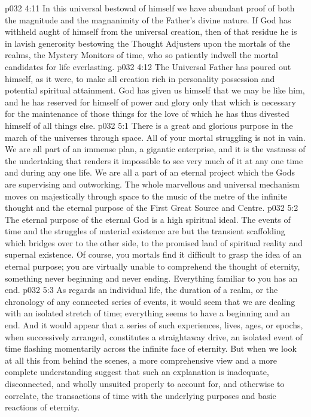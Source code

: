\vs p032 4:11 In this universal bestowal of himself we have abundant proof of both the magnitude and the magnanimity of the Father’s divine nature. If God has withheld aught of himself from the universal creation, then of that residue he is in lavish generosity bestowing the Thought Adjusters upon the mortals of the realms, the Mystery Monitors of time, who so patiently indwell the mortal candidates for life everlasting.
\vs p032 4:12 The Universal Father has poured out himself, as it were, to make all creation rich in personality possession and potential spiritual attainment. God has given us himself that we may be like him, and he has reserved for himself of power and glory only that which is necessary for the maintenance of those things for the love of which he has thus divested himself of all things else.
\vs p032 5:1 There is a great and glorious purpose in the march of the universes through space. All of your mortal struggling is not in vain. We are all part of an immense plan, a gigantic enterprise, and it is the vastness of the undertaking that renders it impossible to see very much of it at any one time and during any one life. We are all a part of an eternal project which the Gods are supervising and outworking. The whole marvellous and universal mechanism moves on majestically through space to the music of the metre of the infinite thought and the eternal purpose of the First Great Source and Centre.
\vs p032 5:2 The eternal purpose of the eternal God is a high spiritual ideal. The events of time and the struggles of material existence are but the transient scaffolding which bridges over to the other side, to the promised land of spiritual reality and supernal existence. Of course, you mortals find it difficult to grasp the idea of an eternal purpose; you are virtually unable to comprehend the thought of eternity, something never beginning and never ending. Everything familiar to you has an end.
\vs p032 5:3 \pc As regards an individual life, the duration of a realm, or the chronology of any connected series of events, it would seem that we are dealing with an isolated stretch of time; everything seems to have a beginning and an end. And it would appear that a series of such experiences, lives, ages, or epochs, when successively arranged, constitutes a straightaway drive, an isolated event of time flashing momentarily across the infinite face of eternity. But when we look at all this from behind the scenes, a more comprehensive view and a more complete understanding suggest that such an explanation is inadequate, disconnected, and wholly unsuited properly to account for, and otherwise to correlate, the transactions of time with the underlying purposes and basic reactions of eternity.
